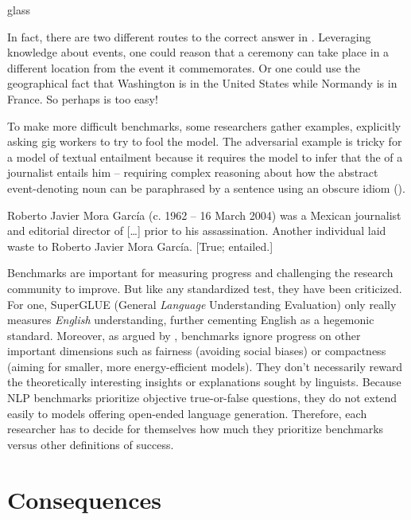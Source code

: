 \begin{tblsfilledsymbol}{}{glass}
\begin{underthehood}
In fact, there are two different routes to the correct answer in .  Leveraging knowledge about events, one could reason that a ceremony can take place in a different location from the event it commemorates.  Or one could use the geographical fact that Washington is in the United States while Normandy is in France.  So perhaps  is too easy!

To make more difficult benchmarks, some researchers gather  examples, explicitly asking gig workers to try to fool the model.  The adversarial example  is tricky for a model of textual entailment   \citep{Nie-etal:2020} because it requires the model to infer that the  of a journalist entails  him -- requiring complex reasoning about how the abstract event-denoting noun  can be paraphrased by a sentence using an obscure idiom ().


\ea \label{adversary} 
    \ea \label{roberto} Roberto Javier Mora Garc\'ia (c. 1962 – 16 March 2004) was a Mexican journalist and editorial director of   [\ldots] prior to his assassination.
    \ex  \label{waste} Another individual laid waste to Roberto Javier Mora Garc\'ia. [True; entailed.]
\z
\z 

Benchmarks are important for measuring progress and challenging the research community to improve.  But like any standardized test, they have been criticized.  For one, SuperGLUE (General \emph{Language} Understanding Evaluation)  only really measures \emph{English} understanding, further cementing English as a hegemonic standard.  Moreover, as argued by \citet{EthJurafsky:2020}, benchmarks ignore progress on other important dimensions such as fairness (avoiding social biases) or compactness (aiming for smaller, more energy-efficient models).  They don't necessarily reward the theoretically interesting insights or explanations sought by linguists.  Because NLP benchmarks prioritize objective true-or-false questions, they do not extend easily to models offering open-ended language generation.   Therefore, each researcher has to decide for themselves how much they prioritize benchmarks versus other definitions of success.


\end{underthehood}
\end{tblsfilledsymbol}



\section{Consequences}


